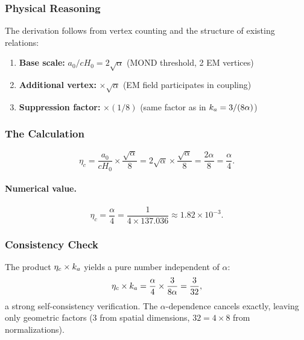 \subsubsection{Physical Reasoning}

The derivation follows from vertex counting and the structure of existing relations:
\begin{enumerate}[nosep]
\item \textbf{Base scale:} $a_0/cH_0 = 2\sqrt{\alpha}$ (MOND threshold, 2 EM vertices)
\item \textbf{Additional vertex:} $\times\sqrt{\alpha}$ (EM field participates in coupling)
\item \textbf{Suppression factor:} $\times(1/8)$ (same factor as in $k_a = 3/(8\alpha)$)
\end{enumerate}

\subsubsection{The Calculation}

\begin{equation}
\eta_c = \frac{a_0}{cH_0} \times \frac{\sqrt{\alpha}}{8} = 2\sqrt{\alpha} \times \frac{\sqrt{\alpha}}{8} = \frac{2\alpha}{8} = \frac{\alpha}{4}.
\label{eq:eta-c-derivation}
\end{equation}

\paragraph{Numerical value.}
\begin{equation}
\eta_c = \frac{\alpha}{4} = \frac{1}{4 \times 137.036} \approx 1.82 \times 10^{-3}.
\end{equation}

\subsubsection{Consistency Check}

The product $\eta_c \times k_a$ yields a pure number independent of $\alpha$:
\begin{equation}
\eta_c \times k_a = \frac{\alpha}{4} \times \frac{3}{8\alpha} = \frac{3}{32},
\label{eq:consistency-check}
\end{equation}
a strong self-consistency verification. The $\alpha$-dependence cancels exactly, 
leaving only geometric factors ($3$ from spatial dimensions, $32 = 4 \times 8$ 
from normalizations).

